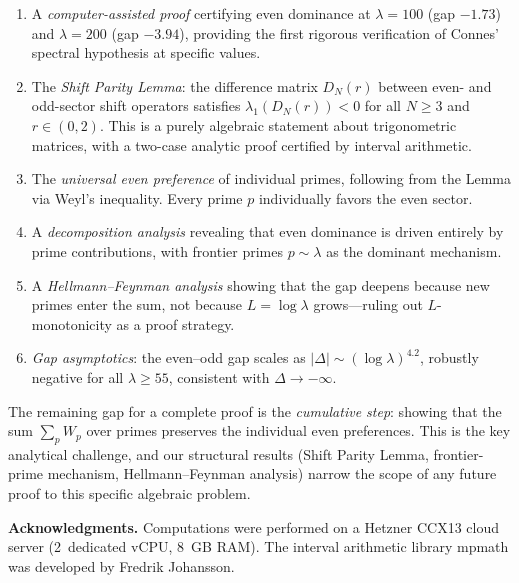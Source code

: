 \documentclass[12pt,a4paper]{article}
\theoremstyle{definition}
\theoremstyle{remark}
\begin{document}
\begin{enumerate}
  \item A \emph{computer-assisted proof} certifying even dominance at $\lambda = 100$ (gap $-1.73$) and $\lambda = 200$ (gap $-3.94$), providing the first rigorous verification of Connes' spectral hypothesis at specific values.

  \item The \emph{Shift Parity Lemma}: the difference matrix $D_N(r)$ between even- and odd-sector shift operators satisfies $\lambda_1(D_N(r)) < 0$ for all $N \geq 3$ and $r \in (0,2)$. This is a purely algebraic statement about trigonometric matrices, with a two-case analytic proof certified by interval arithmetic.

  \item The \emph{universal even preference} of individual primes, following from the Lemma via Weyl's inequality. Every prime $p$ individually favors the even sector.

  \item A \emph{decomposition analysis} revealing that even dominance is driven entirely by prime contributions, with frontier primes $p \sim \lambda$ as the dominant mechanism.

  \item A \emph{Hellmann--Feynman analysis} showing that the gap deepens because new primes enter the sum, not because $L = \log\lambda$ grows---ruling out $L$-monotonicity as a proof strategy.

  \item \emph{Gap asymptotics}: the even--odd gap scales as $|\Delta| \sim (\log\lambda)^{4.2}$, robustly negative for all $\lambda \geq 55$, consistent with $\Delta \to -\infty$.
\end{enumerate}

The remaining gap for a complete proof is the \emph{cumulative step}: showing that the sum $\sum_p W_p$ over primes preserves the individual even preferences. This is the key analytical challenge, and our structural results (Shift Parity Lemma, frontier-prime mechanism, Hellmann--Feynman analysis) narrow the scope of any future proof to this specific algebraic problem.

\bigskip
\noindent\textbf{Acknowledgments.} Computations were performed on a Hetzner CCX13 cloud server (2~dedicated vCPU, 8~GB RAM). The interval arithmetic library mpmath was developed by Fredrik Johansson.
\end{document}
